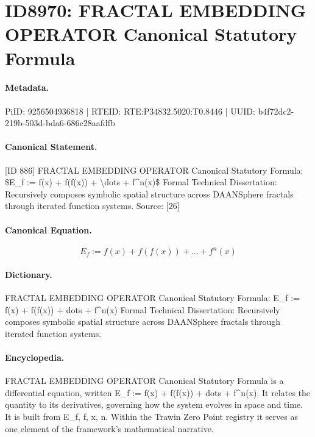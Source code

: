 \section*{ID8970: FRACTAL EMBEDDING OPERATOR Canonical Statutory Formula}
\paragraph{Metadata.}
PiID: 9256504936818 | RTEID: RTE:P34832.5020:T0.8446 | UUID: b4f72dc2-219b-503d-bda6-686c28aafdfb

\paragraph{Canonical Statement.}
[ID 886] FRACTAL EMBEDDING OPERATOR Canonical Statutory Formula: \$E\_f := f(x) + f(f(x)) + \textbackslash{}dots + f\textasciicircum{}n(x)\$ Formal Technical Dissertation: Recursively composes symbolic spatial structure across DAANSphere fractals through iterated function systems. Source: [26]

\paragraph{Canonical Equation.}
\[
E_f := f(x) + f(f(x)) + \dots + f^n(x)
\]

\paragraph{Dictionary.}
FRACTAL EMBEDDING OPERATOR Canonical Statutory Formula: E\_f := f(x) + f(f(x)) + dots + f\textasciicircum{}n(x) Formal Technical Dissertation: Recursively composes symbolic spatial structure across DAANSphere fractals through iterated function systems.

\paragraph{Encyclopedia.}
FRACTAL EMBEDDING OPERATOR Canonical Statutory Formula is a differential equation, written E\_f := f(x) + f(f(x)) + dots + f\textasciicircum{}n(x). It relates the quantity to its derivatives, governing how the system evolves in space and time. It is built from E\_f, f, x, n. Within the Trawin Zero Point registry it serves as one element of the framework's mathematical narrative.
